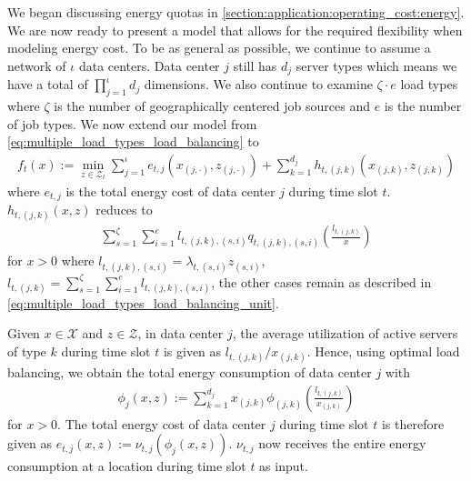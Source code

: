 We began discussing energy quotas in \autoref{section:application:operating_cost:energy}. We are now ready to present a model that allows for the required flexibility when modeling energy cost. To be as general as possible, we continue to assume a network of $\iota$ data centers. Data center $j$ still has $d_j$ server types which means we have a total of $\prod_{j=1}^{\iota} d_j$ dimensions. We also continue to examine $\zeta \cdot e$ load types where $\zeta$ is the number of geographically centered job sources and $e$ is the number of job types. We now extend our model from \autoref{eq:multiple_load_types_load_balancing} to \begin{align*}
    f_t(x) := \min_{z \in \mathcal{Z}_t} \sum_{j=1}^{\iota} e_{t,j}(x_{(j,\cdot)},z_{(j,\cdot)}) + \sum_{k=1}^{d_j} h_{t,(j,k)}(x_{(j,k)},z_{(j,k)})
\end{align*} where $e_{t,j}$ is the total energy cost of data center $j$ during time slot $t$. $h_{t,(j,k)}(x,z)$ reduces to \begin{align*}
    \sum_{s=1}^{\zeta} \sum_{i=1}^e l_{t,(j,k),(s,i)} q_{t,(j,k),(s,i)}\left(\frac{l_{t,(j,k)}}{x}\right)
\end{align*} for $x > 0$ where $l_{t,(j,k),(s,i)} = \lambda_{t,(s,i)} z_{(s,i)}$, $l_{t,(j,k)} = \sum_{s=1}^{\zeta} \sum_{i=1}^e l_{t,(j,k),(s,i)}$, the other cases remain as described in \autoref{eq:multiple_load_types_load_balancing_unit}.

Given $x \in \mathcal{X}$ and $z \in \mathcal{Z}$, in data center $j$, the average utilization of active servers of type $k$ during time slot $t$ is given as $l_{t,(j,k)} / x_{(j,k)}$. Hence, using optimal load balancing, we obtain the total energy consumption of data center $j$ with \begin{align*}
    \phi_j(x,z) := \sum_{k=1}^{d_j} x_{(j,k)} \phi_{(j,k)}\left(\frac{l_{t,(j,k)}}{x_{(j,k)}}\right)
\end{align*} for $x > 0$. The total energy cost of data center $j$ during time slot $t$ is therefore given as $e_{t,j}(x,z) := \nu_{t,j}(\phi_j(x,z))$. $\nu_{t,j}$ now receives the entire energy consumption at a location during time slot $t$ as input.

